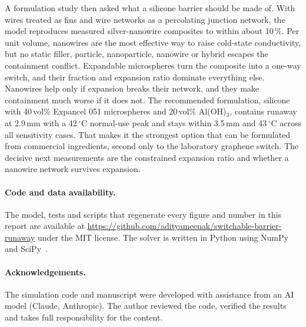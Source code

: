 \documentclass[11pt]{article}
\begin{document}
A formulation study then asked what a silicone barrier should be made of. With wires
treated as fins and wire networks as a percolating junction network, the model
reproduces measured silver-nanowire composites to within about 10\,\%. Per unit volume,
nanowires are the most effective way to raise cold-state conductivity, but no static
filler, particle, nanoparticle, nanowire or hybrid escapes the containment conflict.
Expandable microspheres turn the composite into a one-way switch, and their fraction
and expansion ratio dominate everything else. Nanowires help only if expansion breaks
their network, and they make containment much worse if it does not. The recommended
formulation, silicone with 40\,vol\% Expancel 051 microspheres and 20\,vol\% Al(OH)$_3$, contains
runaway at 2.9\,mm with a 42\,$^\circ$C normal-use peak and stays within 3.5\,mm and
43\,$^\circ$C across all sensitivity cases. That makes it the strongest option that can be
formulated from commercial ingredients, second only to the laboratory graphene switch.
The decisive next measurements are the constrained expansion ratio and whether a
nanowire network survives expansion.

\paragraph{Code and data availability.}
The model, tests and scripts that regenerate every figure and number in this report are
available at \url{https://github.com/adityameenak/switchable-barrier-runaway} under the
MIT license. The solver is written in Python using NumPy~\cite{harris2020numpy} and
SciPy~\cite{virtanen2020scipy}.

\paragraph{Acknowledgements.}
The simulation code and manuscript were developed with assistance from an AI model
(Claude, Anthropic). The author reviewed the code, verified the results and takes full
responsibility for the content.



\end{document}
